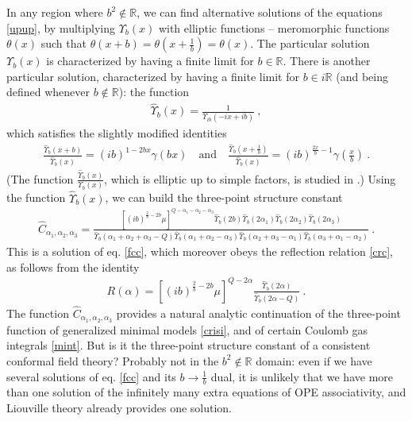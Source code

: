 \documentclass[12pt,a4paper,notitlepage]{report}
\numberwithin{equation}{section}
\theoremstyle{break}
\begin{document}
In any region where $b^2\notin{\mathbb{R}}$, we can find alternative solutions of the equations \eqref{upup}, by multiplying $\Upsilon_b(x)$ with elliptic functions -- meromorphic functions $\theta(x)$ such that $\theta(x+b)=\theta(x+\frac{1}{b}) = \theta(x)$.
The particular solution $\Upsilon_b(x)$ is characterized by having a finite limit for $b\in {\mathbb{R}}$. 
There is another particular solution, characterized by having a finite limit for $b\in i{\mathbb{R}}$ (and being defined whenever $b\notin{\mathbb{R}}$): the function 
\begin{align}
 \hat{\Upsilon}_b(x) = \frac{1}{\Upsilon_{ib}(-ix+ib)}\ ,
\label{tub}
\end{align}
which satisfies the slightly modified identities
 \begin{align}
 \frac{\hat{\Upsilon}_b(x+b)}{\hat{\Upsilon}_b(x)} = (ib)^{1-2bx} \gamma(bx)\quad \text{and} \quad \frac{\hat{\Upsilon}_b(x+\frac{1}{b})}{\hat{\Upsilon}_b(x)} = (ib)^{\frac{2x}{b}-1} \gamma(\tfrac{x}{b})\ .
\end{align}
(The function $\frac{\hat{\Upsilon}_b(x)}{\Upsilon_b(x)}$, which is elliptic up to simple factors, is studied in \cite{zam05}.)
Using the function $\hat{\Upsilon}_b(x)$, we can build the three-point structure constant
\begin{align}
 \hat{C}_{\alpha_1,\alpha_2,\alpha_3} =  \frac{\left[(ib)^{\frac{2}{b}-2b}\mu\right]^{Q-\alpha_1-\alpha_2-\alpha_3}\hat{\Upsilon}_b(2b) \hat{\Upsilon}_b(2\alpha_1) \hat{\Upsilon}_b(2\alpha_2) \hat{\Upsilon}_b(2\alpha_3)}{\hat{\Upsilon}_b(\alpha_1+\alpha_2+\alpha_3-Q) \hat{\Upsilon}_b(\alpha_1+\alpha_2-\alpha_3)\hat{\Upsilon}_b(\alpha_2+\alpha_3-\alpha_1)\hat{\Upsilon}_b(\alpha_3+\alpha_1-\alpha_2)} \ .
\label{hc}
\end{align}
This is a solution of eq. \eqref{fcc}, which moreover obeys 
the reflection relation \eqref{crc}, as follows from the identity
\begin{align}
 R(\alpha)=\left[(ib)^{\frac{2}{b}-2b}\mu\right]^{Q-2\alpha}\frac{\hat{\Upsilon}_b(2\alpha)}{\hat{\Upsilon}_b(2\alpha-Q)}\ .
\end{align}
The function $\hat{C}_{\alpha_1,\alpha_2,\alpha_3}$ provides a natural analytic continuation of the three-point function of generalized minimal models \eqref{crisi}, and of certain Coulomb gas integrals \eqref{mint}.
But is it the three-point structure constant of a consistent conformal field theory? Probably not in the $b^2\notin{\mathbb{R}}$ domain: even if we have several solutions of eq. \eqref{fcc} and its 
$b\rightarrow \frac{1}{b}$ dual, it is unlikely that we have more than one solution of the infinitely many extra equations of OPE associativity, and Liouville theory already provides one solution.
\end{document}
